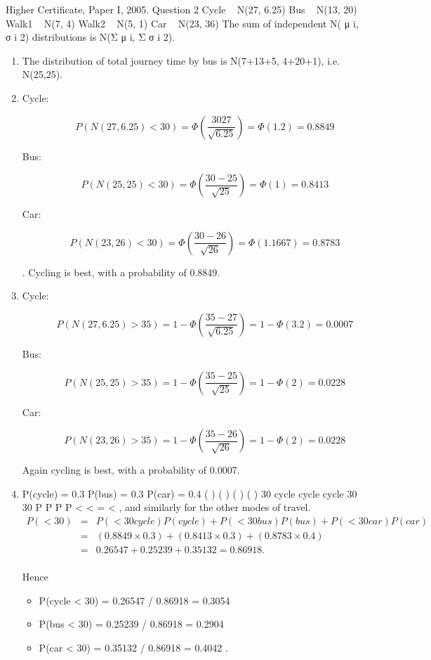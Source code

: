 \documentclass[a4paper,12pt]{article}
\begin{document}
Higher Certificate, Paper I, 2005. Question 2
Cycle ~ N(27, 6.25)
Bus ~ N(13, 20) Walk1 ~ N(7, 4) Walk2 ~ N(5, 1)
Car ~ N(23, 36)
The sum of independent N( μ
i, σ
i 2) distributions is N(Σ μ
i, Σ σ
i 2).

\begin{enumerate}

\item The distribution of total journey time by bus is N(7+13+5, 4+20+1), i.e. N(25,25).


\item

\begin{description}
\item[Cycle: ]
\[P (N(27,6.25) < 30)  = \Phi \left( \frac{30 27}{\sqrt{6.25}} \right)  = \Phi(1.2) = 0.8849\]

\item[Bus:]
\[P (N(25,25) < 30)  = \Phi \left( \frac{30- 25}{\sqrt{25}} \right)  = \Phi(1) = 0.8413\]
\item[Car:]
\[P (N(23,26) < 30)  = \Phi \left( \frac{30- 26}{\sqrt{26}} \right)  = \Phi(1.1667) = 0.8783\]

\end{description}
.
Cycling is best, with a probability of 0.8849.

\item 
\begin{description}
\item[Cycle: ]
\[P (N(27,6.25) >35)  = 1- \Phi \left( \frac{35- 27}{\sqrt{6.25}} \right)  = 1- \Phi(3.2) = 0.0007\]

\item[Bus:]
\[P (N(25,25) >35)  = 1- \Phi \left( \frac{35- 25}{\sqrt{25}} \right)  = 1- \Phi(2) = 0.0228\]
\item[Car:]
\[P (N(23,26) >35)  = 1- \Phi \left( \frac{35- 26}{\sqrt{26}} \right)  = 1- \Phi(2) = 0.0228\]

\end{description}
Again cycling is best, with a probability of 0.0007.
\item  P(cycle) = 0.3 P(bus) = 0.3 P(car) = 0.4
( ) ( ) ( )
( )
30 cycle cycle
cycle 30
30
P P
P
P
<
< =
<
, and similarly for the other modes of travel.
\begin{eqnarray*}
P(< 30) &=& P(< 30 cycle)P(cycle) + P(< 30 bus)P(bus) + P(< 30 car)P(car)\\
&=& (0.8849\times 0.3) + (0.8413\times 0.3) + (0.8783\times 0.4)\\
&=& 0.26547 + 0.25239 + 0.35132 = 0.86918.\\
\end{eqnarray*}

Hence 
\begin{itemize}
\item P(cycle < 30) = 0.26547 / 0.86918 = 0.3054
\item P(bus < 30) = 0.25239 / 0.86918 = 0.2904
\item P(car < 30) = 0.35132 / 0.86918 = 0.4042 .
\end{itemize}
\end{enumerate}
\end{document}
